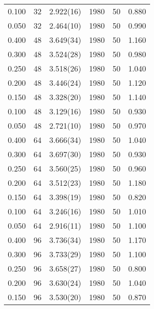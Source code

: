 \begin{tabular}{rrlrrr}
 0.100 &      32 & 2.922(16)  &                1980 &                  50 &    0.880 \\
 0.050 &      32 & 2.464(10)  &                1980 &                  50 &    0.990 \\
 0.400 &      48 & 3.649(34)  &                1980 &                  50 &    1.160 \\
 0.300 &      48 & 3.524(28)  &                1980 &                  50 &    0.980 \\
 0.250 &      48 & 3.518(26)  &                1980 &                  50 &    1.040 \\
 0.200 &      48 & 3.446(24)  &                1980 &                  50 &    1.120 \\
 0.150 &      48 & 3.328(20)  &                1980 &                  50 &    1.140 \\
 0.100 &      48 & 3.129(16)  &                1980 &                  50 &    0.930 \\
 0.050 &      48 & 2.721(10)  &                1980 &                  50 &    0.970 \\
 0.400 &      64 & 3.666(34)  &                1980 &                  50 &    1.040 \\
 0.300 &      64 & 3.697(30)  &                1980 &                  50 &    0.930 \\
 0.250 &      64 & 3.560(25)  &                1980 &                  50 &    0.960 \\
 0.200 &      64 & 3.512(23)  &                1980 &                  50 &    1.180 \\
 0.150 &      64 & 3.398(19)  &                1980 &                  50 &    0.820 \\
 0.100 &      64 & 3.246(16)  &                1980 &                  50 &    1.010 \\
 0.050 &      64 & 2.916(11)  &                1980 &                  50 &    1.100 \\
 0.400 &      96 & 3.736(34)  &                1980 &                  50 &    1.170 \\
 0.300 &      96 & 3.733(29)  &                1980 &                  50 &    1.100 \\
 0.250 &      96 & 3.658(27)  &                1980 &                  50 &    0.800 \\
 0.200 &      96 & 3.630(24)  &                1980 &                  50 &    1.040 \\
 0.150 &      96 & 3.530(20)  &                1980 &                  50 &    0.870 \\

\end{tabular}
